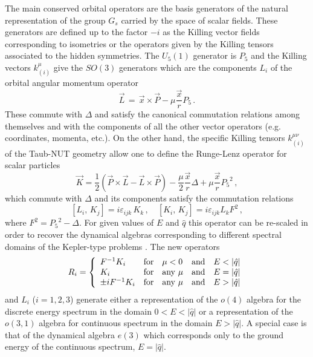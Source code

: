 \documentclass[a4paper,12pt]{article}
\begin{document}
The main conserved orbital operators are  the basis generators of the 
natural representation of the group $G_{s}$ carried by the space of 
scalar fields. These generators are defined up to the factor 
$-i$ as the Killing vector fields corresponding to isometries or the 
operators given by the Killing tensors associated to the hidden symmetries. 
The  $U_{5}(1)$ generator is $P_{5}$ and the  Killing vectors 
$k_{(i)}^{\mu}$ give the $SO(3)$ generators which are the components $L_i$ 
of the orbital angular momentum operator \cite{CV2,CV4}
\begin{equation}\label{(angmom)}
\vec{L}\,=\,\vec{x}\times\vec{P}-\mu\frac{\vec{x}}{r}P_{5}\,.
\end{equation} 
These commute with $\Delta$ and satisfy the canonical commutation 
relations among themselves and with the components of all the other 
vector operators (e.g. coordinates,  momenta, etc.). On the other hand, 
the specific Killing tensors $k_{(i)}^{\mu\nu}$ of the Taub-NUT geometry 
allow one to define the Runge-Lenz operator for scalar particles 
\cite{GRFH}
\begin{equation}\label{RLorb}   
\vec{K}=
\frac{1}{2}(\vec{P}\times \vec{L}-\vec{L}\times \vec{P})-
\frac{\mu}{2}\frac{\vec{x}}{r}\Delta +\mu\frac{\vec{x}}{r}{P_{5}}^{2}\,,
\end{equation}
which commute with $\Delta$ and its components satisfy the commutation 
relations
\begin{equation}\label{algKL1}
\left[ L_{i},\, K_{j} \right] = i \varepsilon_{ijk}\,K_{k}\,,\quad
\left[ K_{i},\, K_{j} \right] = i \varepsilon_{ijk}L_{k}F^2\,, 
\end{equation}
where $F^2 ={P_5}^2-\Delta$. For given values of $E$ and $\hat q$ this 
operator can be re-scaled in order to  recover the dynamical algebras 
corresponding to different spectral domains of the Kepler-type problems  
\cite{GRFH}. The new operators
\begin{equation}\label{Ri}
R_{i}=\left\{  
\begin{array}{lllll}
{ F}^{-1}{ K}_{i}&{\rm for}& \mu<0&{\rm and}&E<|\hat q|\\
{ K}_{i}&{\rm for}&{\rm any}~ \mu&{\rm and}&E=|\hat q|\\
\pm i{ F}^{-1}{ K}_{i}&{\rm for}&{\rm any}~ \mu &{\rm and}& E>|\hat q|
\end{array}\right.
\end{equation}
and $L_i$ ($i=1,2,3$)  generate either a  representation of the $o(4)$ 
algebra for the discrete energy spectrum in the domain $0<E<|\hat q|$ or 
a representation of the $o(3,1)$ algebra for  continuous spectrum in the 
domain $E>|\hat q|$. A special case is that of the  dynamical algebra  
$e(3)$ which  corresponds only to the ground energy of the continuous 
spectrum, $E=|\hat q|$. 
\end{document}
